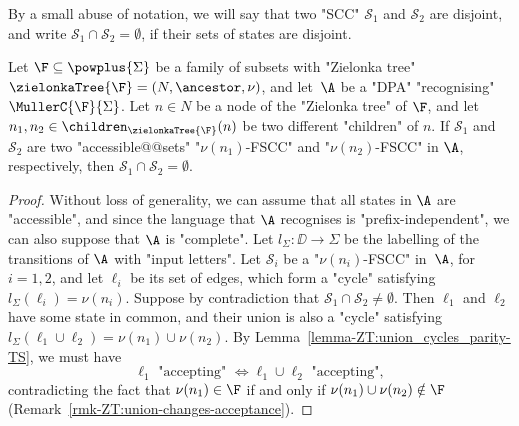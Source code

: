 \documentclass[10pt,a4paper]{amsart}
\renewcommand{\S}{\mathcal{S}}
\renewcommand{\SS}{\Sigma}
\begin{document}
By a small abuse of notation, we will say that two "SCC" $\S_1$ and $\S_2$ are disjoint, and write $\S_1\cap \S_2 = \emptyset$, if their sets of states are disjoint.

\begin{lemma}\label{lemma-ZT:disjoint-children-FSCC}
	Let $\F\subseteq \powplus{\SS}$ be a family of subsets with "Zielonka tree" $\zielonkaTree{\F} = (N, \ancestor, \nu)$, and let~$\A$ %
	be a "DPA" "recognising" $\MullerC{\F}{\SS}$. Let $n\in N$ be a node of the "Zielonka tree" of $\F$, and let $n_1, n_2\in \children_{\zielonkaTree{\F}}(n)$ be two different "children" of $n$. If $\S_1$ and $\S_2$ are two "accessible@@sets" "$\nu(n_1)$-FSCC" and "$\nu(n_2)$-FSCC" in $\A$, respectively, then $\S_1\cap \S_2 = \emptyset$.
\end{lemma}
\begin{proof}
	Without loss of generality, we can assume that all states in $\A$ are "accessible", and since the language that $\A$ recognises is "prefix-independent", we can also suppose that $\A$ is "complete". 
	Let $l_\SS\colon \DD \to \SS$ be the labelling of the transitions of $\A$ with "input letters".
	Let $\S_i$ be a "$\nu(n_i)$-FSCC" in~$\A$, for $i=1,2$, and let $\ell_i$ be its set of edges, which form a "cycle" satisfying $l_\SS(\ell_i) = \nu(n_i)$. 
	Suppose by contradiction that $\S_1\cap \S_2 \neq \emptyset$. Then $\ell_1$ and $\ell_2$ have some state in common, and their union is also a "cycle" satisfying $l_\SS(\ell_1\cup\ell_2) = \nu(n_1)\cup \nu(n_2)$. By Lemma~\ref{lemma-ZT:union_cycles_parity-TS}, we must have
	\[ \ell_1 \text{ "accepting" } \iff \ell_1\cup \ell_2 \text{ "accepting"},\]
	contradicting the fact that $\nu(n_1)\in \F$ if and only if $\nu(n_1)\cup \nu(n_2)\notin \F$ (Remark~\ref{rmk-ZT:union-changes-acceptance}).	
\end{proof}
\end{document}
